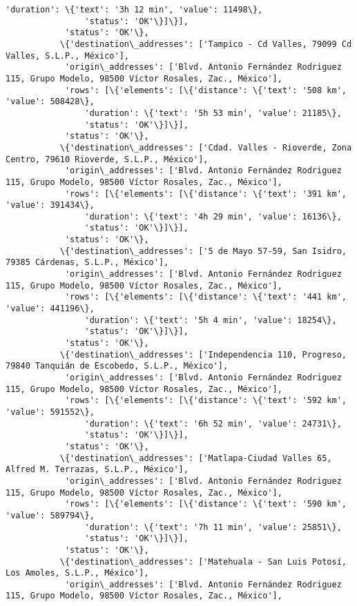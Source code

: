 \documentclass[11pt]{article}
\begin{document}
\begin{Verbatim}[commandchars=\\\{\}]
                'duration': \{'text': '3h 12 min', 'value': 11498\},
                'status': 'OK'\}]\}],
            'status': 'OK'\},
           \{'destination\_addresses': ['Tampico - Cd Valles, 79099 Cd Valles, S.L.P., México'],
            'origin\_addresses': ['Blvd. Antonio Fernández Rodriguez 115, Grupo Modelo, 98500 Víctor Rosales, Zac., México'],
            'rows': [\{'elements': [\{'distance': \{'text': '508 km', 'value': 508428\},
                'duration': \{'text': '5h 53 min', 'value': 21185\},
                'status': 'OK'\}]\}],
            'status': 'OK'\},
           \{'destination\_addresses': ['Cdad. Valles - Rioverde, Zona Centro, 79610 Rioverde, S.L.P., México'],
            'origin\_addresses': ['Blvd. Antonio Fernández Rodriguez 115, Grupo Modelo, 98500 Víctor Rosales, Zac., México'],
            'rows': [\{'elements': [\{'distance': \{'text': '391 km', 'value': 391434\},
                'duration': \{'text': '4h 29 min', 'value': 16136\},
                'status': 'OK'\}]\}],
            'status': 'OK'\},
           \{'destination\_addresses': ['5 de Mayo 57-59, San Isidro, 79385 Cárdenas, S.L.P., México'],
            'origin\_addresses': ['Blvd. Antonio Fernández Rodriguez 115, Grupo Modelo, 98500 Víctor Rosales, Zac., México'],
            'rows': [\{'elements': [\{'distance': \{'text': '441 km', 'value': 441196\},
                'duration': \{'text': '5h 4 min', 'value': 18254\},
                'status': 'OK'\}]\}],
            'status': 'OK'\},
           \{'destination\_addresses': ['Independencia 110, Progreso, 79840 Tanquián de Escobedo, S.L.P., México'],
            'origin\_addresses': ['Blvd. Antonio Fernández Rodriguez 115, Grupo Modelo, 98500 Víctor Rosales, Zac., México'],
            'rows': [\{'elements': [\{'distance': \{'text': '592 km', 'value': 591552\},
                'duration': \{'text': '6h 52 min', 'value': 24731\},
                'status': 'OK'\}]\}],
            'status': 'OK'\},
           \{'destination\_addresses': ['Matlapa-Ciudad Valles 65, Alfred M. Terrazas, S.L.P., México'],
            'origin\_addresses': ['Blvd. Antonio Fernández Rodriguez 115, Grupo Modelo, 98500 Víctor Rosales, Zac., México'],
            'rows': [\{'elements': [\{'distance': \{'text': '590 km', 'value': 589794\},
                'duration': \{'text': '7h 11 min', 'value': 25851\},
                'status': 'OK'\}]\}],
            'status': 'OK'\},
           \{'destination\_addresses': ['Matehuala - San Luis Potosí, Los Amoles, S.L.P., México'],
            'origin\_addresses': ['Blvd. Antonio Fernández Rodriguez 115, Grupo Modelo, 98500 Víctor Rosales, Zac., México'],

\end{Verbatim}
\end{document}
